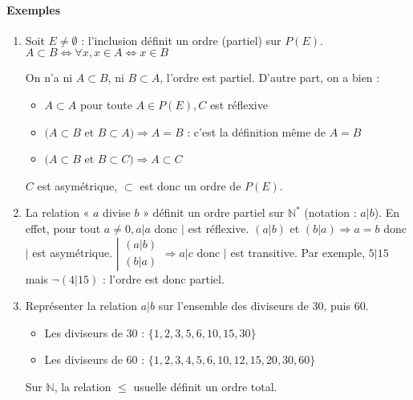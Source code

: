 \documentclass[11pt]{article}
\begin{document}
        \paragraph{Exemples}
            \begin{enumerate}
                \item Soit $E\neq\emptyset$ : l'inclusion définit un ordre (partiel) sur $P(E)$. $A\subset B\Leftrightarrow\forall x,x\in A\Leftrightarrow x\in B$

                On n'a ni $A\subset B$, ni $B\subset A$, l'ordre est partiel. D'autre part, on a bien :
                \begin{itemize}
                    \item $A\subset A$ pour toute $A\in P(E), C$ est réflexive
                    \item $(A\subset B$ et $B\subset A)\Rightarrow A=B$ : c'est la définition même de $A=B$
                    \item $(A\subset B$ et $B\subset C)\Rightarrow A\subset C$
                \end{itemize}

                $C$ est asymétrique, $\subset$ est donc un ordre de $P(E)$.

                \item La relation « $a$ divise $b$ » définit un ordre partiel sur $\mathbb{N}^*$ (notation : $a|b$). En effet, pour tout $a\neq 0, a|a$ donc $|$ est réflexive. $(a|b)$ et $(b|a)\Rightarrow a=b$ donc $|$ est asymétrique. $\left|\begin{matrix}(a|b)\\(b|a)\end{matrix}\right.\Rightarrow a|c$ donc $|$ est transitive. Par exemple, $5|15$ mais $\lnot(4|15)$ : l'ordre est donc partiel.
                \item Représenter la relation $a|b$ sur l'ensemble des diviseurs de 30, puis 60.
                    \begin{itemize}
                        \item Les diviseurs de 30 : $\{1,2,3,5,6,10,15,30\}$
                        \item Les diviseurs de 60 : $\{1,2,3,4,5,6,10,12,15,20,30,60\}$
                    \end{itemize}

                Sur $\mathbb{N}$, la relation $\leq$ usuelle définit un ordre total.
            \end{enumerate}
\end{document}
